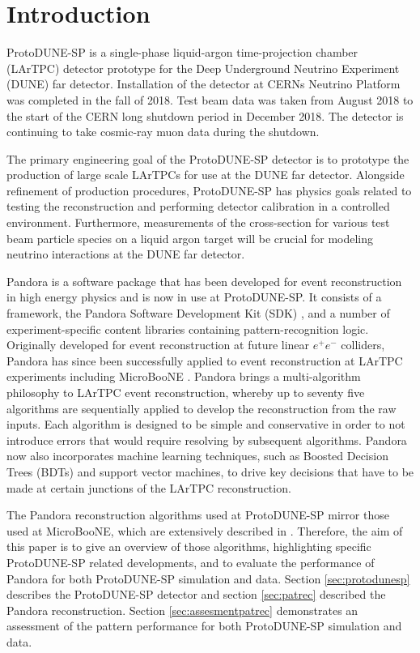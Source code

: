 \section{Introduction}
\label{sec:intro}
ProtoDUNE-SP is a single-phase liquid-argon time-projection chamber (LArTPC) detector prototype for the Deep Underground Neutrino Experiment (DUNE) far detector.  Installation of the detector at CERNs Neutrino Platform was completed in the fall of 2018.  Test beam data was taken from August 2018 to the start of the CERN long shutdown period in December 2018.  The detector is continuing to take cosmic-ray muon data during the shutdown.  

The primary engineering goal of the ProtoDUNE-SP detector is to prototype the production of large scale LArTPCs for use at the DUNE far detector.  Alongside refinement of production procedures, ProtoDUNE-SP has physics goals related to testing the reconstruction and performing detector calibration in a controlled environment.  Furthermore, measurements of the cross-section for various test beam particle species on a liquid argon target will be crucial for modeling neutrino interactions at the DUNE far detector.

Pandora is a software package that has been developed for event reconstruction in high energy physics and is now in use at ProtoDUNE-SP.  It consists of a framework, the Pandora Software Development Kit (SDK) \cite{pandorasdk}, and a number of experiment-specific content libraries containing pattern-recognition logic.  Originally developed for event reconstruction at future linear $e^{+}e^{-}$ colliders, Pandora has since been successfully applied to event reconstruction at LArTPC experiments including MicroBooNE \cite{pandorauboone}.  Pandora brings a multi-algorithm philosophy to LArTPC event reconstruction, whereby up to seventy five algorithms are sequentially applied to develop the reconstruction from the raw inputs.  Each algorithm is designed to be simple and conservative in order to not introduce errors that would require resolving by subsequent algorithms.  Pandora now also incorporates machine learning techniques, such as Boosted Decision Trees (BDTs) and support vector machines, to drive key decisions that have to be made at certain junctions of the LArTPC reconstruction. 

The Pandora reconstruction algorithms used at ProtoDUNE-SP mirror those used at MicroBooNE, which are extensively described in \cite{pandorauboone}.  Therefore, the aim of this paper is to give an overview of those algorithms, highlighting specific ProtoDUNE-SP related developments, and to evaluate the performance of Pandora for both ProtoDUNE-SP simulation and data.  Section \ref{sec:protodunesp} describes the ProtoDUNE-SP detector and section \ref{sec:patrec} described the Pandora reconstruction.  Section \ref{sec:assesmentpatrec} demonstrates an assessment of the pattern performance for both ProtoDUNE-SP simulation and data.  

